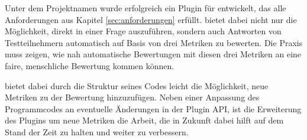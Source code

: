 Unter dem Projektnamen  wurde erfolgreich ein Plugin für  entwickelt, das alle Anforderungen aus Kapitel \ref{sec:anforderungen} erfüllt.  bietet dabei nicht nur die Möglichkeit,  direkt in einer Frage auszuführen, sondern auch Antworten von Testteilnehmern automatisch auf Basis von drei Metriken zu bewerten. Die Praxis muss zeigen, wie nah automatische Bewertungen mit diesen drei Metriken an eine faire, menschliche Bewertung kommen können.

 bietet dabei durch die Struktur seines Codes leicht die Möglichkeit, neue Metriken zu der Bewertung hinzuzufügen. Neben einer Anpassung des Programmcodes an eventuelle Änderungen in der  Plugin API, ist die Erweiterung des Plugins um neue Metriken die Arbeit, die in Zukunft dabei hilft  auf dem Stand der Zeit zu halten und weiter zu verbessern.